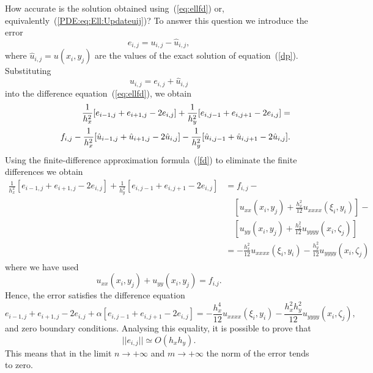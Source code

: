 How accurate is the solution obtained using~(\ref{eq:ellfd}) or,
equivalently~(\ref{PDE:eq:Ell:Updateuij})? To answer this question
we introduce the error
%
\begin{equation*}
  e_{i,j}=u_{i,j}-\hat u_{i,j},
\end{equation*}
%
where $\hat u_{i,j}=u(x_i,y_j)$ are the values of the exact solution
of equation~(\ref{dp}). Substituting
%
\begin{equation*}
  u_{i,j}=e_{i,j}+\hat u_{i,j}
\end{equation*}
%
into the difference equation~(\ref{eq:ellfd}), we obtain
%
\begin{eqnarray*}
 & & \frac{1}{h_x^2}[e_{i-1,j}+e_{i+1,j}-2e_{i,j}] +
      \frac{1}{h_y^2}[e_{i,j-1}+e_{i,j+1}-2e_{i,j}] = \\
 & & \hspace{10mm} f_{i,j} -
     \frac{1}{h_x^2}[\hat u_{i-1,j}+\hat u_{i+1,j}-2\hat u_{i,j}] -
     \frac{1}{h_y^2}[\hat u_{i,j-1}+\hat u_{i,j+1}-2\hat u_{i,j}].
\end{eqnarray*}
%
Using the finite-difference approximation formula~(\ref{fd}) to
eliminate the finite differences we obtain
%
\begin{align*}
  \frac{1}{h_x^2}[e_{i-1,j}+e_{i+1,j}-2e_{i,j}] +
     \frac{1}{h_y^2}[e_{i,j-1}+e_{i,j+1}-2e_{i,j}] & =
     f_{i,j} - \\
     & \quad [u_{xx}(x_i,y_j) + \frac{h_x^2}{12}u_{xxxx}(\xi_i,y_i)] -
     \\
     & \quad [u_{y y}(x_i,y_j)+\frac{h_2^2}{12}u_{yyyy}(x_i,\zeta_j)] \\
     & = - \frac{h_x^2}{12}u_{xxxx}(\xi_i,y_i) -
     \frac{h_y^2}{12}u_{yyyy}(x_i,\zeta_j)
\end{align*}
%
where we have used
%
\begin{equation*}
  u_{xx}(x_i,y_j)+u_{y y}(x_i,y_j)=f_{i.j}.
\end{equation*}
%
Hence, the error satisfies the difference equation
%
\begin{equation*}
  e_{i-1,j}+e_{i+1,j}-2e_{i,j}+\alpha[e_{i,j-1}+e_{i,j+1}-2e_{i,j}]=
  -\frac{h_x^4}{12}u_{xxxx}(\xi_i,y_i)-
  \frac{h_x^2 h_y^2}{12}u_{yyyy}(x_i,\zeta_j),
\end{equation*}
%
and zero boundary conditions. Analysing this equality, it is possible
to prove that
%
\begin{equation*}
  ||e_{i,j}|| \simeq O(h_x h_y).
\end{equation*}
%
This means that in the limit $n\to +\infty$ and $m\to +\infty$ the
norm of the error tends to zero.

